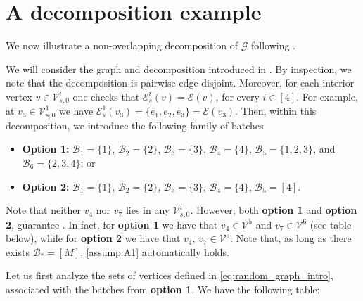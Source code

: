 \documentclass[a4paper, 10pt, english]{article}
\begin{document}
	
\section{A decomposition example}\label{sec:example_decomp}

We now illustrate a non-overlapping decomposition of $\mathcal{G}$ following .

\smallbreak
{} 
We will consider the graph and decomposition introduced in .  By inspection, we note that the decomposition is pairwise edge-disjoint. Moreover, for each interior vertex $v\in\mathcal{V}_{s,0}^i$ one checks that $\mathcal{E}^i_s(v)=\mathcal{E}(v)$, for every $i\in[4]$. For example, at $v_3\in\mathcal{V}_{s,0}^1$ we have  $\mathcal{E}^1_s(v_3) = \{e_1,e_2,e_3\} = \mathcal{E}(v_3)$. Then, within this decomposition, we introduce the following family of batches
\begin{itemize}
    \item {\bf Option 1:} $\mathcal{B}_{1} = \{1\}$, $\mathcal{B}_{2} = \{2\}$, $\mathcal{B}_{3} = \{3\}$, $\mathcal{B}_{4} = \{4\}$, $\mathcal{B}_{5} = \{1,2,3\}$, and $\mathcal{B}_{6} = \{2,3,4\}$; or
    \item {\bf Option 2:} $\mathcal{B}_{1} = \{1\}$, $\mathcal{B}_{2} = \{2\}$, $\mathcal{B}_{3} = \{3\}$, $\mathcal{B}_{4} = \{4\}$, $\mathcal{B}_5=[4]$.
\end{itemize}
Note that neither $v_4$ nor $v_7$ lies in any $\mathcal{V}_{s,0}^i$. However, both {\bf option 1} and  {\bf option 2}, guarantee . In fact, for {\bf option 1} we have that $v_4\in \mathcal{V}^5$ and $v_7\in \mathcal{V}^6$ (see table below), while for {\bf option 2} we have that $v_4,\,v_7\in \mathcal{V}^5$. Note that, as long as there exists $\mathcal{B}_* =[M]$, \cref{assump:A1} automatically holds.
\medbreak



 Let us first analyze the sets of vertices defined in \eqref{eq:random_graph_intro}, associated with the batches from {\bf option 1}. We have the following table:
\end{document}

